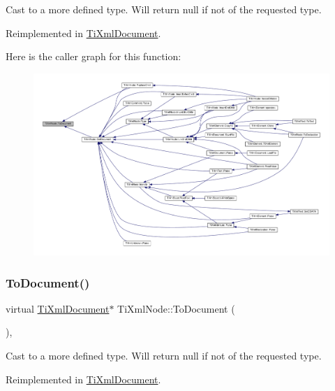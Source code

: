 Cast to a more defined type. Will return null if not of the requested type. 



Reimplemented in \hyperlink{class_ti_xml_document_a468e582640e3c4f740f7168d8b4a6e4a}{Ti\+Xml\+Document}.

Here is the caller graph for this function\+:\nopagebreak
\begin{figure}[H]
\begin{center}
\leavevmode
\includegraphics[width=350pt]{class_ti_xml_node_a775a904618cad6e4a8049bda4f5a6aa9_icgraph}
\end{center}
\end{figure}
\mbox{\label{class_ti_xml_node_a6a4c8ac28ee7a745d059db6691e03bae}} 
\subsubsection{\texorpdfstring{To\+Document()}{ToDocument()}\hspace{0.1cm}{\footnotesize\ttfamily [2/2]}}
{\footnotesize\ttfamily virtual \hyperlink{class_ti_xml_document}{Ti\+Xml\+Document}$\ast$ Ti\+Xml\+Node\+::\+To\+Document (\begin{DoxyParamCaption}{ }\end{DoxyParamCaption})\hspace{0.3cm}{\ttfamily [inline]}, {\ttfamily [virtual]}}



Cast to a more defined type. Will return null if not of the requested type. 



Reimplemented in \hyperlink{class_ti_xml_document_a1025d942a1f328fd742d545e37efdd42}{Ti\+Xml\+Document}.

